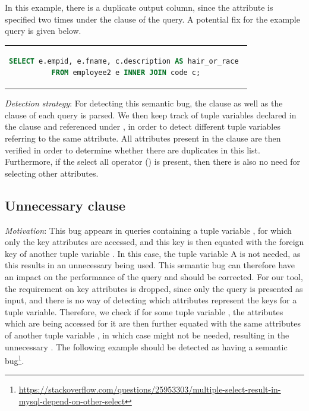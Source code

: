 In this example, there is a duplicate output column, since the  attribute is specified two times under the  clause of the query. A potential fix for the example query is given below.

\begin{center}
\begin{tabular}{c}
\begin{lstlisting}[language=SQL]
SELECT e.empid, e.fname, c.description AS hair_or_race 
FROM employee2 e INNER JOIN code c;
\end{lstlisting}
\end{tabular}
\end{center}

\noindent \emph{Detection strategy}: For detecting this semantic bug, the  clause as well as the  clause of each query is parsed. We then keep track of tuple variables declared in the  clause and referenced under , in order to detect different tuple variables referring to the same attribute. All attributes present in the  clause are then verified in order to determine whether there are duplicates in this list. Furthermore, if the select all operator (\sql{*}) is present, then there is also no need for selecting other attributes.

\subsection{Unnecessary  clause}
\emph{Motivation}: This bug appears in queries containing a tuple variable , for which only the key attributes are accessed, and this key is then equated with the foreign key of another tuple variable . In this case, the tuple variable A is not needed, as this results in an unnecessary  being used. This semantic bug can therefore have an impact on the performance of the query and should be corrected. For our tool, the requirement on key attributes is dropped, since only the query is presented as input, and there is no way of detecting which attributes represent the keys for a tuple variable. Therefore, we check if for some tuple variable , the attributes which are being accessed for it are then further equated with the same attributes of another tuple variable , in which case  might not be needed, resulting in the unnecessary . The following example should be detected as having a semantic bug\footnote{\url{https://stackoverflow.com/questions/25953303/multiple-select-result-in-mysql-depend-on-other-select}}.

